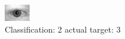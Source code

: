 \begin{figure}[h!]
\begin{center}
\includegraphics[width=0.60\columnwidth]{figures/ID678_class_2_target_3.png}
\end{center}
\caption{ Classification: 2 actual target: 3}
\label{fig:ID678_class_2_target_3}
\end{figure}
